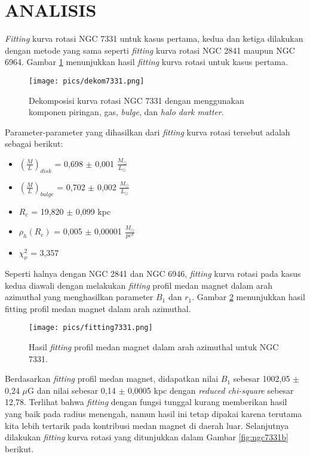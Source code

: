 \section{ANALISIS}
\textit{Fitting} kurva rotasi NGC 7331 untuk kasus pertama, kedua dan ketiga dilakukan dengan metode yang sama seperti \textit{fitting} kurva rotasi NGC 2841 maupun NGC 6964. Gambar \ref{fig:ngc7331} menunjukkan hasil \textit{fitting} kurva rotasi untuk kasus pertama. \\
\begin{figure}[H]
\centering 
\texttt{[image: pics/dekom7331.png]}
\caption[Plot Kurva Rotasi NGC 7331 tanpa Medan Magnet]{Dekomposisi kurva rotasi NGC 7331 dengan menggunakan komponen piringan, gas, \textit{bulge}, dan \textit{halo dark matter}.}
\label{fig:ngc7331}
\end{figure}
Parameter-parameter yang dihasilkan dari \textit{fitting} kurva rotasi tersebut adalah sebagai berikut:
\begin{itemize}
\item $(\frac{M}{L})_{disk}$ = 0,698 $\pm$ 0,001 $\frac{M_{\odot}}{L_{\odot}}$
\item $(\frac{M}{L})_{bulge}$ = 0,702 $\pm$ 0,002 $\frac{M_{\odot}}{L_{\odot}}$
\item $R_{c}$ = 19,820 $\pm$ 0,099 kpc
\item $\rho_{h}(R_{c})$ = 0,005 $\pm$ 0,00001 $\frac{M_{\odot}}{pc^{3}}$
\item $\chi_{\nu}^{2}$ = 3,357
\end{itemize}
	Seperti halnya dengan NGC 2841 dan NGC 6946, \textit{fitting} kurva rotasi pada kasus kedua diawali dengan melakukan \textit{fitting} profil medan magnet dalam arah azimuthal yang menghasilkan parameter $B_{1}$ dan $r_{1}$. Gambar \ref{fig:fitngc7331} menunjukkan hasil fitting profil medan magnet dalam arah azimuthal.\\
\begin{figure}[H]
\centering 
\texttt{[image: pics/fitting7331.png]}
\caption[Plot \textit{fitting} Profil Medan Magnet Azimuthal Galaksi NGC 7331]{Hasil \textit{fitting} profil medan magnet dalam arah azimuthal untuk NGC 7331.}
\label{fig:fitngc7331}
\end{figure}
	Berdasarkan \textit{fitting} profil medan magnet, didapatkan nilai $B_{1}$ sebesar 1002,05 $\pm$ 0,24 $\mu$G dan nilai  sebesar 0,14 $\pm$ 0,0005 kpc dengan \textit{reduced chi-square} sebesar 12,78. Terlihat bahwa \textit{fitting} dengan fungsi tunggal kurang memberikan hasil yang baik pada radius menengah, namun hasil ini tetap dipakai karena terutama kita lebih tertarik pada kontribusi medan magnet di daerah luar. Selanjutnya dilakukan \textit{fitting} kurva rotasi yang ditunjukkan dalam Gambar \ref{fig:ngc7331b} berikut.\\
